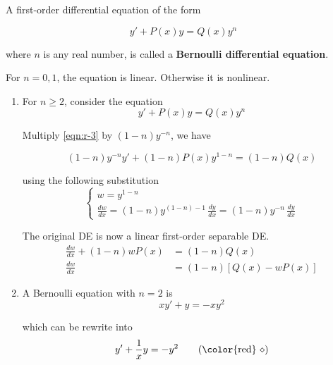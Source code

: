 \begin{example}
    A first-order differential equation of the form 

    \[
        y' + P(x)y = Q(x)y^n
    \]

    where $n$ is any real number, is called a \textbf{Bernoulli differential equation}.

    For $n = 0, 1$, the equation is linear. Otherwise it is nonlinear.

\end{example}
\begin{solution}
    \begin{enumerate}
        \item For $n \geq 2$, consider the equation 
            \begin{equation}
                y' + P(x)y = Q(x)y^n \label{eqn:r-3}
            \end{equation}

            Multiply \eqref{eqn:r-3} by $(1-n)y^{-n}$, we have 

            \[
                (1-n)y^{-n}y' + (1-n)P(x)y^{1-n} = (1-n)Q(x)
            \]

            using the following substitution
            \[
                \begin{cases}
                    w = y^{1-n}\\[0.5em]
                    \displaystyle \frac{dw}{dx} = (1-n)y^{(1-n)-1}\, \frac{dy}{dx} = (1-n)y^{-n}\, \frac{dy}{dx}
                \end{cases}
            \]

            The original DE is now a linear first-order separable DE.
            \begin{align*}
                \frac{dw}{dx} + (1-n)w P(x) &= (1-n)Q(x)\\
                \frac{dw}{dx} &= (1-n)[Q(x) - wP(x)] 
            \end{align*}

        \item A Bernoulli equation with $n=2$ is 
            \begin{equation}
                xy' + y = -xy^2
            \end{equation}

            which can be rewrite into 
            \begin{equation}
                y' + \frac{1}{x} y = - y^2 \label{eq:sln1} \tag{{\color{red} $\diamond$}}
            \end{equation}


\end{enumerate}
\end{solution}
